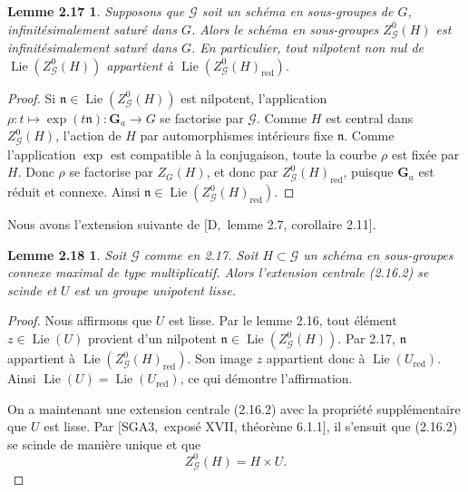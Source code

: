 \documentclass[11pt]{article}
\newcommand{\Ga}{\mathbf G_a}
\newcommand{\Lie}{\operatorname{Lie}}
\newcommand{\red}{\mathrm{red}}
\newtheorem*{lemme217}{Lemme 2.17}
\newtheorem*{lemme218}{Lemme 2.18}
\begin{document}
\begin{lemme217}
Supposons que \(\mathcal G\) soit un schéma en sous-groupes de \(G\),
infinitésimalement saturé dans \(G\). Alors le schéma en sous-groupes
\(Z^0_{\mathcal G}(H)\) est infinitésimalement saturé dans \(G\). En particulier, tout
nilpotent non nul de \(\Lie(Z^0_{\mathcal G}(H))\) appartient à
\(\Lie(Z^0_{\mathcal G}(H)_{\red})\).
\end{lemme217}

\begin{proof}
Si \(\mathfrak n\in\Lie(Z^0_{\mathcal G}(H))\) est nilpotent, l'application
\(\rho:t\mapsto\exp(t\mathfrak n):\Ga\to G\) se factorise par \(\mathcal G\). Comme
\(H\) est central dans \(Z^0_{\mathcal G}(H)\), l'action de \(H\) par automorphismes
intérieurs fixe \(\mathfrak n\). Comme l'application \(\exp\) est compatible à la
conjugaison, toute la courbe \(\rho\) est fixée par \(H\). Donc \(\rho\) se factorise
par \(Z_G(H)\), et donc par \(Z^0_{\mathcal G}(H)_{\red}\), puisque \(\Ga\) est réduit
et connexe. Ainsi \(\mathfrak n\in\Lie(Z^0_{\mathcal G}(H)_{\red})\).
\end{proof}

Nous avons l'extension suivante de \([\mathrm D,\) lemme 2.7, corollaire 2.11].

\begin{lemme218}
Soit \(\mathcal G\) comme en 2.17. Soit \(H\subset\mathcal G\) un schéma en
sous-groupes connexe maximal de type multiplicatif. Alors l'extension centrale (2.16.2)
se scinde et \(U\) est un groupe unipotent lisse.
\end{lemme218}

\begin{proof}
Nous affirmons que \(U\) est lisse. Par le lemme 2.16, tout élément \(z\in\Lie(U)\)
provient d'un nilpotent \(\mathfrak n\in\Lie(Z^0_{\mathcal G}(H))\). Par 2.17,
\(\mathfrak n\) appartient à \(\Lie(Z^0_{\mathcal G}(H)_{\red})\). Son image \(z\)
appartient donc à \(\Lie(U_{\red})\). Ainsi \(\Lie(U)=\Lie(U_{\red})\), ce qui démontre
l'affirmation.

On a maintenant une extension centrale (2.16.2) avec la propriété supplémentaire que
\(U\) est lisse. Par \([\mathrm{SGA3},\) exposé XVII, théorème 6.1.1], il s'ensuit que
(2.16.2) se scinde de manière unique et que
\begin{equation}
  Z^0_{\mathcal G}(H)=H\times U.
  \tag{2.18.1}
\end{equation}
\end{proof}
\end{document}
